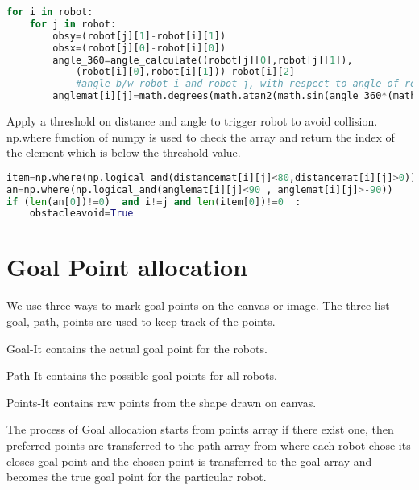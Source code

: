 \documentclass[main.tex]{subfiles}
\begin{document}
\begin{lstlisting}[language=Python, caption = Angle Matrix ]
for i in robot:
	for j in robot:
		obsy=(robot[j][1]-robot[i][1])
		obsx=(robot[j][0]-robot[i][0])
		angle_360=angle_calculate((robot[j][0],robot[j][1]),
			(robot[i][0],robot[i][1]))-robot[i][2] 
			#angle b/w robot i and robot j, with respect to angle of robot i (relative angle)       
		anglemat[i][j]=math.degrees(math.atan2(math.sin(angle_360*(math.pi/180)),math.cos(angle_360*(math.pi/180)))) #relative angle in range(-180 to 180) 
\end{lstlisting}

Apply a threshold on distance and angle to trigger robot to avoid collision.
np.where function of numpy is used to check the array and return the index of the element which is below the threshold value.

\begin{lstlisting}[language=Python, caption = Searching matrix ]
item=np.where(np.logical_and(distancemat[i][j]<80,distancemat[i][j]>0)) 
an=np.where(np.logical_and(anglemat[i][j]<90 , anglemat[i][j]>-90))
if (len(an[0])!=0)  and i!=j and len(item[0])!=0  : 
	obstacleavoid=True
\end{lstlisting}
\pagebreak	
\section{Goal Point allocation}
We use three ways to mark goal points on the canvas or image.
The three list goal, path, points are used to keep track of the points.

Goal-It contains the actual goal point for the robots.

Path-It contains the possible goal points for all robots.

Points-It contains raw points from the shape drawn on canvas.

The process of Goal allocation starts from points array if there exist one, then preferred points are transferred to the path array from where each robot chose its closes goal point and the chosen point is transferred to the goal array and becomes the true goal point for the particular robot.
\end{document}
